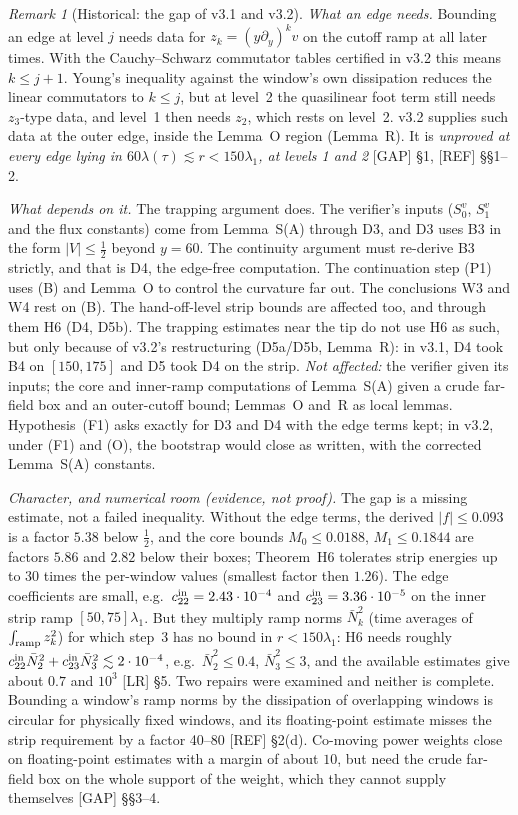 \documentclass[11pt]{amsart}
\theoremstyle{definition}
\theoremstyle{remark}
\newtheorem{remark}[theorem]{Remark}
\newcommand{\dref}[1]{[\textsf{#1}]}
\begin{document}
\begin{remark}[Historical: the gap of v3.1 and v3.2]
\emph{What an edge needs.} Bounding an edge at level $j$ needs data for $z_k=(y\partial_y)^kv$ on the cutoff ramp at all later times. With the Cauchy--Schwarz commutator tables certified in v3.2 this means $k\le j+1$. Young's inequality against the window's own dissipation reduces the linear commutators to $k\le j$, but at level~2 the quasilinear foot term still needs $z_3$-type data, and level~1 then needs $z_2$, which rests on level~2. v3.2 supplies such data at the outer edge, inside the Lemma~O region (Lemma~R). It is \emph{unproved at every edge lying in $60\lambda(\tau)\lesssim r<150\lambda_1$, at levels 1 and 2} \dref{GAP} \S1, \dref{REF} \S\S1--2.

\emph{What depends on it.} The trapping argument does. The verifier's inputs ($S_0^v$, $S_1^v$ and the flux constants) come from Lemma~S(A) through D3, and D3 uses B3 in the form $|V|\le\frac12$ beyond $y=60$. The continuity argument must re-derive B3 strictly, and that is D4, the edge-free computation. The continuation step (P1) uses (B) and Lemma~O to control the curvature far out. The conclusions W3 and W4 rest on (B). The hand-off-level strip bounds are affected too, and through them H6 (D4, D5b). The trapping estimates near the tip do not use H6 as such, but only because of v3.2's restructuring (D5a/D5b, Lemma~R): in v3.1, D4 took B4 on $[150,175]$ and D5 took D4 on the strip. \emph{Not affected:} the verifier given its inputs; the core and inner-ramp computations of Lemma~S(A) given a crude far-field box and an outer-cutoff bound; Lemmas~O and~R as local lemmas. Hypothesis~(F1) asks exactly for D3 and D4 with the edge terms kept; in v3.2, under (F1) and (O), the bootstrap would close as written, with the corrected Lemma~S(A) constants.

\emph{Character, and numerical room (evidence, not proof).} The gap is a missing estimate, not a failed inequality. Without the edge terms, the derived $|f|\le0.093$ is a factor $5.38$ below $\frac12$, and the core bounds $M_0\le0.0188$, $M_1\le0.1844$ are factors $5.86$ and $2.82$ below their boxes; Theorem~H6 tolerates strip energies up to $30$ times the per-window values (smallest factor then $1.26$). The edge coefficients are small, e.g.\ $c^{\rm in}_{22}=2.43\cdot10^{-4}$ and $c^{\rm in}_{23}=3.36\cdot10^{-5}$ on the inner strip ramp $[50,75]\lambda_1$. But they multiply ramp norms $\bar N_k^2$ (time averages of $\int_{\rm ramp}z_k^2$) for which step~3 has no bound in $r<150\lambda_1$: H6 needs roughly $c^{\rm in}_{22}\bar N_2^2+c^{\rm in}_{23}\bar N_3^2\lesssim2\cdot10^{-4}$, e.g.\ $\bar N_2^2\le0.4$, $\bar N_3^2\le3$, and the available estimates give about $0.7$ and $10^3$ \dref{LR} \S5. Two repairs were examined and neither is complete. Bounding a window's ramp norms by the dissipation of overlapping windows is circular for physically fixed windows, and its floating-point estimate misses the strip requirement by a factor 40--80 \dref{REF} \S2(d). Co-moving power weights close on floating-point estimates with a margin of about $10$, but need the crude far-field box on the whole support of the weight, which they cannot supply themselves \dref{GAP} \S\S3--4.


\end{remark}
\end{document}

